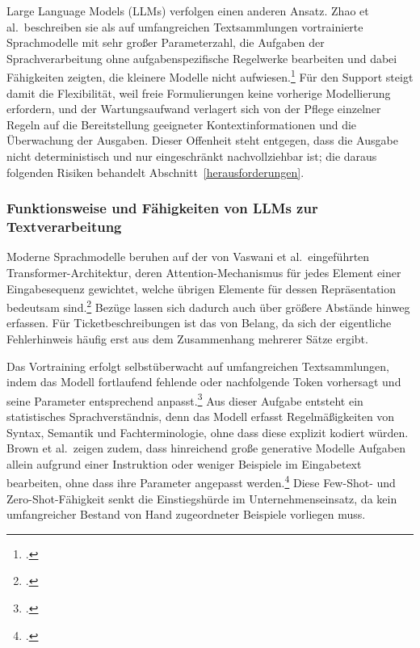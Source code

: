 Large Language Models (LLMs) verfolgen einen anderen Ansatz. Zhao et al.~beschreiben sie als auf umfangreichen Textsammlungen vortrainierte Sprachmodelle mit sehr gro{\ss}er Parameterzahl, die Aufgaben der Sprachverarbeitung ohne aufgabenspezifische Regelwerke bearbeiten und dabei F\"ahigkeiten zeigten, die kleinere Modelle nicht aufwiesen.\footcite[Vgl.][S.~3]{Zhao2023} F\"ur den Support steigt damit die Flexibilit\"at, weil freie Formulierungen keine vorherige Modellierung erfordern, und der Wartungsaufwand verlagert sich von der Pflege einzelner Regeln auf die Bereitstellung geeigneter Kontextinformationen und die \"Uberwachung der Ausgaben. Dieser Offenheit steht entgegen, dass die Ausgabe nicht deterministisch und nur eingeschr\"ankt nachvollziehbar ist; die daraus folgenden Risiken behandelt Abschnitt~\ref{herausforderungen}.

\subsubsection{Funktionsweise und F\"ahigkeiten von LLMs zur Textverarbeitung}
\label{llmFunktion}

Moderne Sprachmodelle beruhen auf der von Vaswani et al.~eingef\"uhrten Transformer-Architektur, deren Attention-Mechanismus f\"ur jedes Element einer Eingabesequenz gewichtet, welche \"ubrigen Elemente f\"ur dessen Repr\"asentation bedeutsam sind.\footcite[Vgl.][hier S.~5999--6000]{Vaswani2017} Bez\"uge lassen sich dadurch auch \"uber gr\"o{\ss}ere Abst\"ande hinweg erfassen. F\"ur Ticketbeschreibungen ist das von Belang, da sich der eigentliche Fehlerhinweis h\"aufig erst aus dem Zusammenhang mehrerer S\"atze ergibt.

Das Vortraining erfolgt selbst\"uberwacht auf umfangreichen Textsammlungen, indem das Modell fortlaufend fehlende oder nachfolgende Token vorhersagt und seine Parameter entsprechend anpasst.\footcites[Vgl.][hier S.~1877\,f\adddot]{Brown2020}[][S.~26]{Zhao2023} Aus dieser Aufgabe entsteht ein statistisches Sprachverst\"andnis, denn das Modell erfasst Regelm\"a{\ss}igkeiten von Syntax, Semantik und Fachterminologie, ohne dass diese explizit kodiert w\"urden. Brown et al.~zeigen zudem, dass hinreichend gro{\ss}e generative Modelle Aufgaben allein aufgrund einer Instruktion oder weniger Beispiele im Eingabetext bearbeiten, ohne dass ihre Parameter angepasst werden.\footcite[Vgl.][S.~1877\,f.]{Brown2020} Diese Few-Shot- und Zero-Shot-F\"ahigkeit senkt die Einstiegsh\"urde im Unternehmenseinsatz, da kein umfangreicher Bestand von Hand zugeordneter Beispiele vorliegen muss.

